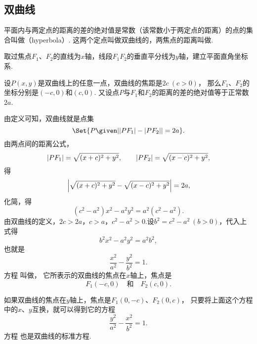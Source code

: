 \subsection{双曲线}
\begin{definition}
平面内与两定点的距离的差的绝对值是常数（该常数小于两定点的距离）的点的集合叫做（hyperbola）.
这两个定点叫做双曲线的，两焦点的距离叫做.
\end{definition}

取过焦点\(F_1\)、\(F_2\)的直线为\(x\)轴，线段\(F_1 F_2\)的垂直平分线为\(y\)轴，建立平面直角坐标系.

设\(P(x,y)\)是双曲线上的任意一点，双曲线的焦距是\(2c\ (c>0)\)，
那么\(F_1\)、\(F_2\)的坐标分别是\((-c,0)\)和\((c,0)\).
又设点\(P\)与\(F_1\)和\(F_2\)的距离的差的绝对值等于正常数\(2a\).

由定义可知，双曲线就是点集\[
\Set{ P \given \abs{\abs{P F_1} - \abs{P F_2}} = 2a }.
\]由两点间的距离公式，\[
\abs{P F_1} = \sqrt{(x+c)^2+y^2},
\qquad
\abs{P F_2} = \sqrt{(x-c)^2+y^2},
\]得\[
\abs{\sqrt{(x+c)^2+y^2} - \sqrt{(x-c)^2+y^2}} = 2a,
\]化简，得\[
(c^2-a^2)x^2 - a^2 y^2 = a^2(c^2-a^2).
\]由双曲线的定义，\(2c > 2a\)，\(c > a\)，\(c^2 - a^2 > 0\).设\(b^2 = c^2 - a^2\ (b > 0)\)，代入上式得\[
b^2 x^2 - a^2 y^2 = a^2 b^2,
\]也就是\begin{equation}\label{equation:解析几何.双曲线的标准方程1}
	\frac{x^2}{a^2} - \frac{y^2}{b^2} = 1.
\end{equation}
方程  叫做，
它所表示的双曲线的焦点在\(x\)轴上，焦点是\[
	F_1(-c,0)
	\quad\text{和}\quad
	F_2(c,0).
\]

如果双曲线的焦点在\(y\)轴上，焦点是\(F_1(0,-c)\)、\(F_2(0,c)\)，
只要将上面这个方程中的\(x\)、\(y\)互换，就可以得到它的方程\begin{equation}\label{equation:解析几何.双曲线的标准方程2}
	\frac{y^2}{a^2}-\frac{x^2}{b^2}=1.
\end{equation}
方程  也是双曲线的标准方程.

